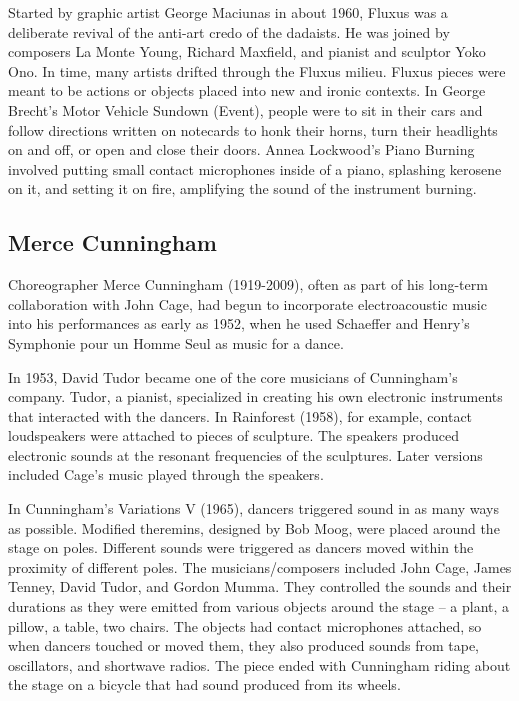 Started by graphic artist George Maciunas in about 1960, Fluxus was a deliberate revival of the anti-art credo of the dadaists. He was joined by composers La Monte Young, Richard Maxfield, and pianist and sculptor Yoko Ono. In time, many artists drifted through the Fluxus milieu. Fluxus pieces were meant to be actions or objects placed into new and ironic contexts. In George Brecht's Motor Vehicle Sundown (Event), people were to sit in their cars and follow directions written on notecards to honk their horns, turn their headlights on and off, or open and close their doors. Annea Lockwood's Piano Burning involved putting small contact microphones inside of a piano, splashing kerosene on it, and setting it on fire, amplifying the sound of the instrument burning.

\subsection{Merce Cunningham}

Choreographer Merce Cunningham (1919-2009), often as part of his long-term collaboration with John Cage, had begun to incorporate electroacoustic music into his performances as early as 1952, when he used Schaeffer and Henry's Symphonie pour un Homme Seul as music for a dance.

In 1953, David Tudor became one of the core musicians of Cunningham's company. Tudor, a pianist, specialized in creating his own electronic instruments that interacted with the dancers. In Rainforest (1958), for example, contact loudspeakers were attached to pieces of sculpture. The speakers produced electronic sounds at the resonant frequencies of the sculptures. Later versions included Cage's music played through the speakers.

In Cunningham's Variations V (1965), dancers triggered sound in as many ways as possible. Modified theremins, designed by Bob Moog, were placed around the stage on poles. Different sounds were triggered as dancers moved within the proximity of different poles. The musicians/composers included John Cage, James Tenney, David Tudor, and Gordon Mumma. They controlled the sounds and their durations as they were emitted from various objects around the stage -- a plant, a pillow, a table, two chairs. The objects had contact microphones attached, so when dancers touched or moved them, they also produced sounds from tape, oscillators, and shortwave radios. The piece ended with Cunningham riding about the stage on a bicycle that had sound produced from its wheels.
 
